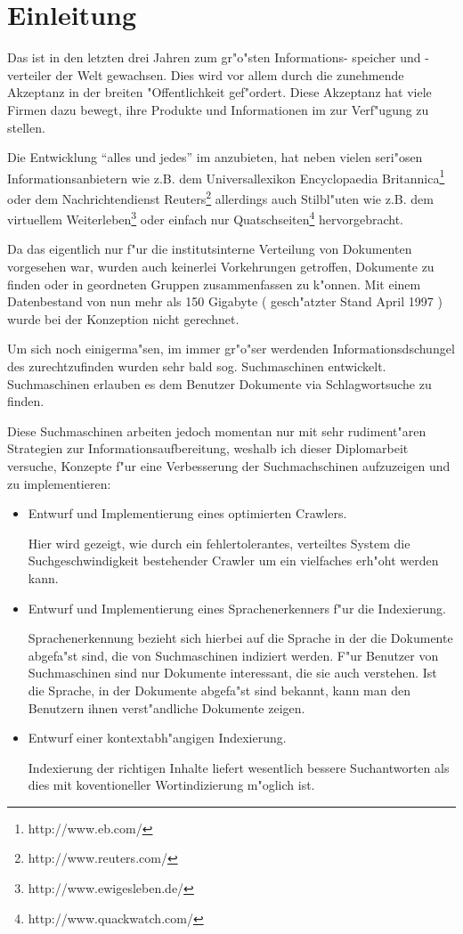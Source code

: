 \chapter{Einleitung}
Das \www ist in den letzten drei Jahren zum gr"o"sten Informations- speicher und -verteiler der Welt gewachsen. Dies wird vor allem durch die zunehmende Akzeptanz in der breiten "Offentlichkeit gef"ordert. Diese Akzeptanz hat viele Firmen dazu bewegt, ihre Produkte und Informationen im \www zur Verf"ugung zu stellen.

Die Entwicklung "`alles und jedes"' im \www anzubieten, hat neben vielen seri"osen Informationsanbietern wie z.B. dem Universallexikon Encyclopaedia Britannica\footnote{http://www.eb.com/} oder dem Nachrichtendienst Reuters\footnote{http://www.reuters.com/} allerdings auch Stilbl"uten wie z.B. dem virtuellem Weiterleben\footnote{http://www.ewigesleben.de/} oder einfach nur Quatschseiten\footnote{http://www.quackwatch.com/} hervorgebracht.

Da das \www eigentlich nur f"ur die institutsinterne Verteilung von Dokumenten vorgesehen war, wurden auch keinerlei Vorkehrungen getroffen, Dokumente zu finden oder in geordneten Gruppen zusammenfassen zu k"onnen. Mit einem Datenbestand von nun mehr als 150 Gigabyte ( gesch"atzter Stand April 1997 ) wurde bei der Konzeption nicht gerechnet.

Um sich noch einigerma"sen, im immer gr"o"ser werdenden Informationsdschungel des \www zurechtzufinden wurden sehr bald sog. Suchmaschinen entwickelt. Suchmaschinen erlauben es dem Benutzer Dokumente via Schlagwortsuche zu finden.

Diese Suchmaschinen arbeiten jedoch momentan nur mit sehr rudiment"aren Strategien zur Informationsaufbereitung, weshalb ich dieser Diplomarbeit versuche, Konzepte f"ur eine Verbesserung der Suchmachschinen aufzuzeigen und zu implementieren:

\begin{itemize}
	\item	Entwurf und Implementierung eines optimierten Crawlers.
	
			Hier wird gezeigt, wie durch ein fehlertolerantes, verteiltes System die Suchgeschwindigkeit bestehender Crawler um ein vielfaches erh"oht werden kann.
	\item	Entwurf und Implementierung eines Sprachenerkenners f"ur die Indexierung.
	
			Sprachenerkennung bezieht sich hierbei auf die Sprache in der die Dokumente abgefa"st sind, die von Suchmaschinen indiziert werden. F"ur Benutzer von Suchmaschinen sind nur Dokumente interessant, die sie auch verstehen. Ist die Sprache, in der Dokumente abgefa"st sind bekannt, kann man den Benutzern ihnen verst"andliche Dokumente zeigen.
			
	\item	Entwurf einer kontextabh"angigen Indexierung.
	
			Indexierung der richtigen Inhalte liefert wesentlich bessere Suchantworten als dies mit koventioneller Wortindizierung m"oglich ist.
\end{itemize}

